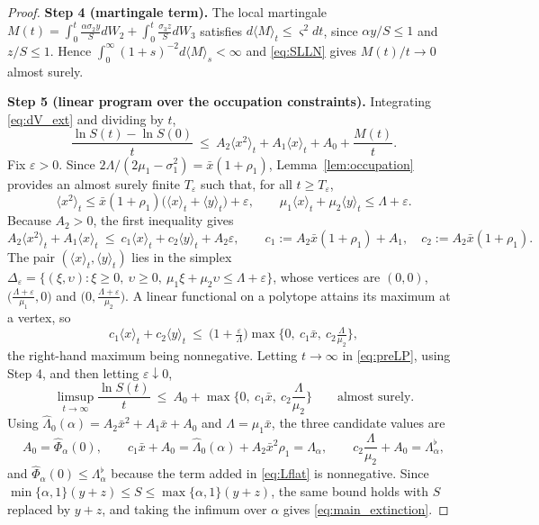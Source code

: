 \documentclass[10pt,a4paper]{amsart}
\newcommand{\avg}[1]{\big\langle #1 \big\rangle_t}
\begin{document}
\begin{proof}
\textbf{Step 4 (martingale term).} The local martingale $M(t)=\int_0^t\frac{\alpha\sigma_2y}{S}dW_2+\int_0^t\frac{\sigma_3z}{S}dW_3$ satisfies $d\langle M\rangle_t\le\varsigma^2dt$, since $\alpha y/S\le1$ and $z/S\le1$. Hence $\int_0^\infty(1+s)^{-2}d\langle M\rangle_s<\infty$ and \eqref{eq:SLLN} gives $M(t)/t\to0$ almost surely.

\textbf{Step 5 (linear  program over the occupation constraints).} Integrating \eqref{eq:dV_ext} and dividing by $t$,
\begin{equation}\label{eq:preLP}
\frac{\ln S(t)-\ln S(0)}{t}\ \le\ A_2\avg{x^2}+A_1\avg{x}+A_0+\frac{M(t)}{t}.
\end{equation}
Fix $\varepsilon>0$. Since $2\Lambda/(2\mu_1-\sigma_1^2)=\bar x(1+\rho_1)$, Lemma~\ref{lem:occupation} provides an almost surely finite $T_\varepsilon$ such that, for all $t\ge T_\varepsilon$,
\[
\avg{x^2}\le \bar x(1+\rho_1)\big(\avg{x}+\avg{y}\big)+\varepsilon,\qquad \mu_1\avg{x}+\mu_2\avg{y}\le\Lambda+\varepsilon .
\]
Because $A_2>0$, the first inequality gives
\[
A_2\avg{x^2}+A_1\avg{x}\ \le\ c_1\avg{x}+c_2\avg{y}+A_2\varepsilon,\qquad c_1:=A_2\bar x(1+\rho_1)+A_1,\quad c_2:=A_2\bar x(1+\rho_1).
\]
The pair $(\avg{x},\avg{y})$ lies in the simplex $\Delta_\varepsilon=\{(\xi,\upsilon):\xi\ge0,\ \upsilon\ge0,\ \mu_1\xi+\mu_2\upsilon\le\Lambda+\varepsilon\}$, whose vertices are $(0,0)$, $\big(\tfrac{\Lambda+\varepsilon}{\mu_1},0\big)$ and $\big(0,\tfrac{\Lambda+\varepsilon}{\mu_2}\big)$. A linear functional on a polytope attains its maximum at a vertex, so
\[
c_1\avg{x}+c_2\avg{y}\ \le\ \Big(1+\tfrac{\varepsilon}{\Lambda}\Big)\max\Big\{0,\ c_1\bar x,\ c_2\tfrac{\Lambda}{\mu_2}\Big\},
\]
the right-hand maximum being nonnegative. Letting $t\to\infty$ in \eqref{eq:preLP}, using Step 4, and then letting $\varepsilon\downarrow0$,
\[
\limsup_{t\to\infty}\frac{\ln S(t)}{t}\ \le\ A_0+\max\Big\{0,\ c_1\bar x,\ c_2\frac{\Lambda}{\mu_2}\Big\}\qquad\text{almost surely.}
\]
Using $\widehat\Lambda_0(\alpha)=A_2\bar x^2+A_1\bar x+A_0$ and $\Lambda=\mu_1\bar x$, the three candidate values are
\[
A_0=\widehat\Phi_\alpha(0),\qquad c_1\bar x+A_0=\widehat\Lambda_0(\alpha)+A_2\bar x^2\rho_1=\Lambda_\alpha,\qquad c_2\frac{\Lambda}{\mu_2}+A_0=\Lambda_\alpha^{\flat},
\]
and $\widehat\Phi_\alpha(0)\le\Lambda_\alpha^\flat$ because the term added in \eqref{eq:Lflat} is nonnegative. Since $\min\{\alpha,1\}(y+z)\le S\le\max\{\alpha,1\}(y+z)$, the same bound holds with $S$ replaced by $y+z$, and taking the infimum over $\alpha$ gives \eqref{eq:main_extinction}.


\end{proof}
\end{document}
